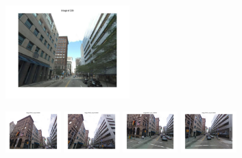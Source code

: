     \begin{figure}[t!]
        \begin{minipage}{1.0\linewidth}
        \end{minipage}
        \begin{minipage}{0.34\linewidth}
            \centering
            \vspace{0mm}
            \includegraphics[trim = 45mm 40mm 45mm 30mm, clip=true,height=36mm]{imgs/Pval/exImproved02/query.jpg}
        \end{minipage}
        \begin{minipage}{0.75\linewidth}
            \begin{minipage}{\linewidth} 
                \colorbox{myGreen}{\includegraphics[trim = 35mm 30mm 35mm 30mm, clip=true, height=16mm]{imgs/Pval/exImproved02/improvedPval01.jpg}}
                \colorbox{myGreen}{\includegraphics[trim = 35mm 30mm 35mm 30mm, clip=true, height=16mm]{imgs/Pval/exImproved02/improvedPval02.jpg}}
                \colorbox{myGreen}{\includegraphics[trim = 35mm 30mm 35mm 30mm, clip=true, height=16mm]{imgs/Pval/exImproved02/improvedPval03.jpg}}
                \colorbox{myGreen}{\includegraphics[trim = 35mm 30mm 35mm 30mm, clip=true, height=16mm]{imgs/Pval/exImproved02/improvedPval04.jpg}}

\end{minipage}
\end{minipage}
\end{figure}
